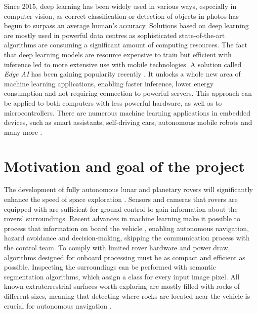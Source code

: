 \documentclass[a4paper,twoside,12pt]{book}
\begin{document}
Since 2015, deep learning has been widely used in various ways, especially in computer vision, as correct classification or detection of objects in photos has begun to surpass an average human's accuracy. Solutions based on deep learning are mostly used in powerful data centres as sophisticated state-of-the-art algorithms are consuming a significant amount of computing resources. The fact that deep learning models are resource expensive to train but efficient with inference led to more extensive use with mobile technologies. A solution called \emph{Edge AI} has been gaining popularity recently \cite{mahdavinejad2018machine}. It unlocks a whole new area of machine learning applications, enabling faster inference, lower energy consumption and not requiring connection to powerful servers. This approach can be applied to both computers with less powerful hardware, as well as to microcontrollers. There are numerous machine learning applications in embedded devices, such as smart assistants, self-driving cars, autonomous mobile robots and many more \cite{merenda2020edge}.



\section{Motivation and goal of the project}
\label{sec:chapter1.1}
The development of fully autonomous lunar and planetary rovers will significantly enhance the speed of space exploration \cite{bajracharya2008autonomy}. Sensors and cameras that rovers are equipped with are sufficient for ground control to gain information about the rovers' surroundings. Recent advances in machine learning make it possible to process that information on board the vehicle \cite{vitulli2022chime}, enabling autonomous navigation, hazard avoidance and decision-making, skipping the communication process with the control team. To comply with limited rover hardware and power draw, algorithms designed for onboard processing must be as compact and efficient as possible. Inspecting the surroundings can be performed with semantic segmentation algorithms, which assign a class for every input image pixel. All known extraterrestrial surfaces worth exploring are mostly filled with rocks of different sizes, meaning that detecting where rocks are located near the vehicle is crucial for autonomous navigation \cite{7119022}.
\end{document}
